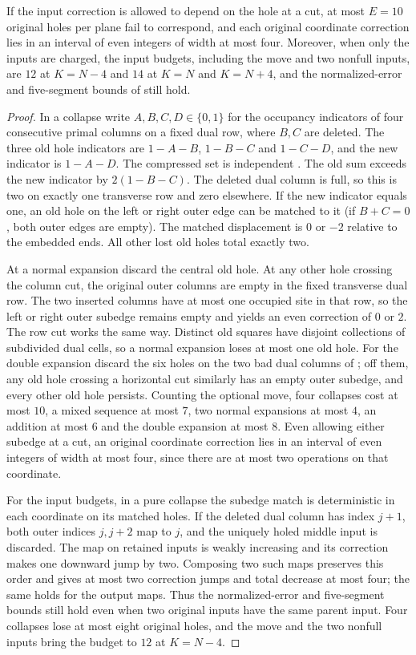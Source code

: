 \documentclass[11pt,colorlinks]{charlie}
\begin{document}
\begin{lemma}\label{lem:second-corr}
If the input correction is allowed to depend on the hole at a cut, at most $E=10$ original holes per plane fail to correspond, and each original coordinate correction lies in an interval of even integers of width at most four. Moreover, when only the inputs are charged, the input budgets, including the move and two nonfull inputs, are $12$ at $K=N-4$ and $14$ at $K=N$ and $K=N+4$, and the normalized-error and five-segment bounds of  still hold.
\end{lemma}

\begin{proof}
In a collapse write $A,B,C,D\in\{0,1\}$ for the occupancy indicators of four consecutive primal columns on a fixed dual row, where $B,C$ are deleted. The three old hole indicators are $1-A-B$, $1-B-C$ and $1-C-D$, and the new indicator is $1-A-D$. The compressed set is independent \cite[Lemma~23]{BHNlong}. The old sum exceeds the new indicator by $2(1-B-C)$. The deleted dual column is full, so this is two on exactly one transverse row and zero elsewhere. If the new indicator equals one, an old hole on the left or right outer edge can be matched to it (if $B+C=0$, both outer edges are empty). The matched displacement is $0$ or $-2$ relative to the embedded ends. All other lost old holes total exactly two.

At a normal expansion discard the central old hole. At any other hole crossing the column cut, the original outer columns are empty in the fixed transverse dual row. The two inserted columns have at most one occupied site in that row, so the left or right outer subedge remains empty and yields an even correction of $0$ or $2$. The row cut works the same way. Distinct old squares have disjoint collections of subdivided dual cells, so a normal expansion loses at most one old hole. For the double expansion discard the six holes on the two bad dual columns of ; off them, any old hole crossing a horizontal cut similarly has an empty outer subedge, and every other old hole persists. Counting the optional move, four collapses cost at most $10$, a mixed sequence at most $7$, two normal expansions at most $4$, an addition at most $6$ and the double expansion at most $8$. Even allowing either subedge at a cut, an original coordinate correction lies in an interval of even integers of width at most four, since there are at most two operations on that coordinate.

For the input budgets, in a pure collapse the subedge match is deterministic in each coordinate on its matched holes. If the deleted dual column has index $j+1$, both outer indices $j,j+2$ map to $j$, and the uniquely holed middle input is discarded. The map on retained inputs is weakly increasing and its correction makes one downward jump by two. Composing two such maps preserves this order and gives at most two correction jumps and total decrease at most four; the same holds for the output maps. Thus the normalized-error and five-segment bounds still hold even when two original inputs have the same parent input. Four collapses lose at most eight original holes, and the move and the two nonfull inputs bring the budget to $12$ at $K=N-4$.


\end{proof}
\end{document}
